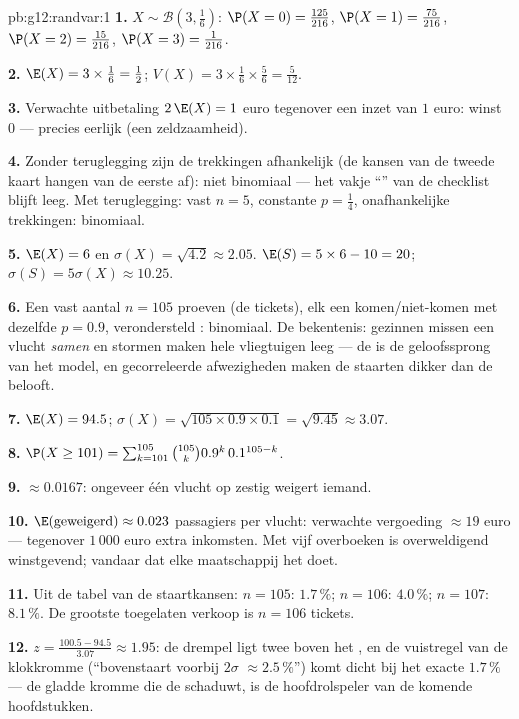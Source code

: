 \begin{solution}{pb:g12:randvar:1}
\textbf{1.} $X \sim \mathcal B\!\left(3, \frac16\right)$:
$\P(X = 0) = \frac{125}{216}$,
$\P(X = 1) = \frac{75}{216}$,
$\P(X = 2) = \frac{15}{216}$,
$\P(X = 3) = \frac{1}{216}$.

\textbf{2.} $\E(X) = 3 \times \frac16 = \frac12$;
$V(X) = 3 \times \frac16 \times \frac56 = \frac{5}{12}$.

\textbf{3.} Verwachte uitbetaling $2\,\E(X) = 1$ euro tegenover een inzet van
$1$ euro: winst $0$ --- precies eerlijk (een zeldzaamheid).

\textbf{4.} Zonder teruglegging zijn de trekkingen afhankelijk (de kansen van
de tweede kaart hangen van de eerste af): niet binomiaal --- het vakje
``'' van de checklist blijft leeg. Met teruglegging: vast
$n = 5$, constante $p = \frac14$, onafhankelijke trekkingen: binomiaal.

\textbf{5.} $\E(X) = 6$ en $\sigma(X) = \sqrt{4.2} \approx 2.05$.
$\E(S) = 5 \times 6 - 10 = 20$; $\sigma(S) = 5\sigma(X) \approx 10.25$.

\textbf{6.} Een vast aantal $n = 105$ proeven (de tickets), elk een
komen/niet-komen met dezelfde $p = 0.9$, verondersteld :
binomiaal. De bekentenis: gezinnen missen een vlucht \emph{samen} en stormen
maken hele vliegtuigen leeg --- de  is de geloofssprong van
het model, en gecorreleerde afwezigheden maken de staarten dikker dan de
 belooft.

\textbf{7.} $\E(X) = 94.5$; $\sigma(X) = \sqrt{105 \times 0.9 \times 0.1} =
\sqrt{9.45} \approx 3.07$.

\textbf{8.} $\P(X \geq 101) = \sum_{k=101}^{105}
\binom{105}{k} 0.9^k\, 0.1^{105 - k}$.

\textbf{9.} $\approx 0.0167$: ongeveer één vlucht op zestig weigert iemand.

\textbf{10.} $\E(\text{geweigerd}) \approx 0.023$ passagiers per vlucht:
verwachte vergoeding $\approx 19$ euro --- tegenover $1\,000$ euro extra
inkomsten. Met vijf overboeken is overweldigend winstgevend; vandaar dat elke
maatschappij het doet.

\textbf{11.} Uit de tabel van de staartkansen: $n = 105$: $1.7\,\%$;
$n = 106$: $4.0\,\%$; $n = 107$: $8.1\,\%$. De grootste toegelaten verkoop is
$n = 106$ tickets.

\textbf{12.} $z = \frac{100.5 - 94.5}{3.07} \approx 1.95$: de drempel ligt
twee  boven het , en de vuistregel van de
klokkromme (``bovenstaart voorbij $2\sigma$ $\approx 2.5\,\%$'') komt dicht bij
het exacte $1.7\,\%$ --- de gladde kromme die de 
schaduwt, is de hoofdrolspeler van de komende hoofdstukken.


\end{solution}
